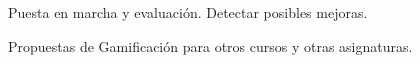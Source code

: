 \documentclass[a4paper, 12pt]{book}
\begin{document}
\label{sec:trabajos_futuros}

Puesta en marcha y evaluación. Detectar posibles mejoras.

Propuestas de Gamificación para otros cursos y otras asignaturas.




\cleardoublepage
\appendix



\cleardoublepage


\printindex
\end{document}
